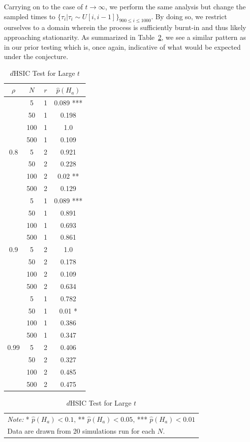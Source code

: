 Carrying on to the case of $t \rightarrow \infty$, we perform the same analysis but change the sampled times to
$\{\tau_{i} | \tau_{i} \sim U[i,i-1]\}_{900 \leq i \leq 1000}$.
By doing so, we restrict ourselves to a domain wherein the process is sufficiently burnt-in and thus likely approaching stationarity.
As summarized in Table~\ref{tab:longtime}, we see a similar pattern as in our prior testing which is, once again, indicative
of what would be expected under the conjecture.
\begin{table}
    \centering
    \caption{$d$HSIC Test for Large $t$}
    \label{tab:longtime}
    \begin{tabular}{|c|c|c|c|}
        \hline
        $\rho$ & $N$ & $r$ & $\hat p(H_{a})$ \\
        \hline
        \hline
        & 5   & 1   & 0.089 ***       \\
        & 50  & 1   & 0.198           \\
        & 100 & 1   & 1.0             \\
        & 500 & 1   & 0.109           \\
        0.8    & 5   & 2   & 0.921           \\
        & 50  & 2   & 0.228           \\
        & 100 & 2   & 0.02 **         \\
        & 500 & 2   & 0.129           \\
        \hline
        & 5   & 1   & 0.089 ***       \\
        & 50  & 1   & 0.891           \\
        & 100 & 1   & 0.693           \\
        & 500 & 1   & 0.861           \\
        0.9    & 5   & 2   & 1.0             \\
        & 50  & 2   & 0.178           \\
        & 100 & 2   & 0.109           \\
        & 500 & 2   & 0.634           \\
        \hline
        & 5   & 1   & 0.782           \\
        & 50  & 1   & 0.01 *          \\
        & 100 & 1   & 0.386           \\
        & 500 & 1   & 0.347           \\
        0.99   & 5   & 2   & 0.406           \\
        & 50  & 2   & 0.327           \\
        & 100 & 2   & 0.485           \\
        & 500 & 2   & 0.475           \\
    \end{tabular}
    \begin{tabular}{p{10cm}}
        \textit{Note:} * $\hat{p}(H_{a}) < 0.1$, ** $\hat{p}(H_{a}) < 0.05$, *** $\hat{p}(H_{a}) < 0.01$
        \\
        Data are drawn from 20 simulations run for each $N$.
    \end{tabular}
\end{table}

